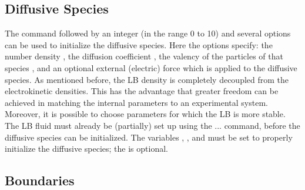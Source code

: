 \subsection{\label{ssec:ek-diff-species}Diffusive Species}

\begin{essyntax}
  \begin{features}
  \end{features}
\end{essyntax}
The  command followed by an integer 
(in the range 0 to 10) and several options can be used to initialize the 
diffusive species. Here the options specify: the number density
, the diffusion coefficient , the valency of the particles 
of that species , and an optional external (electric) force which
is applied to the diffusive species. As mentioned before, the LB density is 
completely decoupled from the electrokinetic densities. This has the advantage
that greater freedom can be achieved in matching the internal parameters to an
experimental system. Moreover, it is possible to choose parameters for which
the LB is more stable. The LB fluid must already be (partially) set up using the 
  ... command, before the diffusive species can
be initialized. The variables , , and  must be 
set to properly initialize the diffusive species; the  is
optional.

\subsection{\label{ssec:ek-boundaries}Boundaries}

